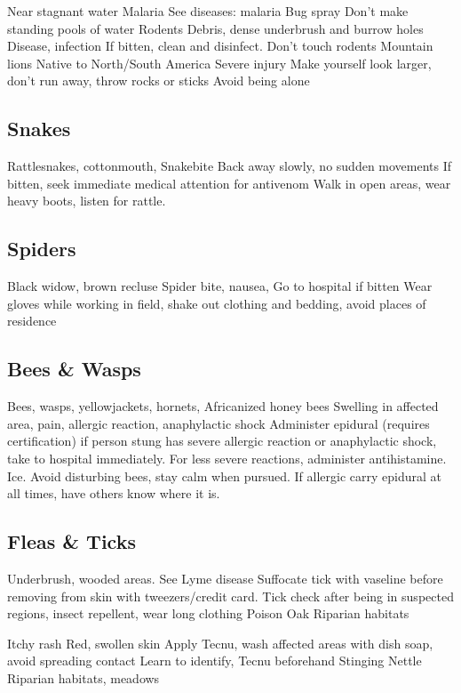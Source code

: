 \documentclass[12pt]{../SOP3_beta}
\begin{document}
Near stagnant water
Malaria
See diseases: malaria
Bug spray
Don’t make standing pools of water
Rodents
Debris, dense underbrush and burrow holes
Disease, infection
If bitten, clean and disinfect.
Don’t touch rodents
Mountain lions
Native to North/South America
Severe injury
Make yourself look larger, don’t run away, throw rocks or sticks
Avoid being alone 


\subsection{Snakes}

Rattlesnakes, cottonmouth, 
Snakebite
Back away slowly, no sudden movements
If bitten, seek immediate medical attention for antivenom
Walk in open areas, wear heavy boots, listen for rattle.

\subsection{Spiders}

Black widow, brown recluse
Spider bite, nausea, 
Go to hospital if bitten
Wear gloves while working in field, shake out clothing and bedding, avoid places of residence

\subsection{Bees \& Wasps}

Bees, wasps, yellowjackets, hornets, Africanized honey bees
Swelling in affected area, pain, allergic reaction, anaphylactic shock
Administer epidural (requires certification) if person stung has severe allergic reaction or anaphylactic shock, take to hospital immediately. For less severe reactions, administer antihistamine. Ice.
Avoid disturbing bees, stay calm when pursued. If allergic carry epidural at all times, have others know where it is.

\subsection{Fleas \& Ticks}

Underbrush, wooded areas.
See Lyme disease
Suffocate tick with vaseline before removing from skin with tweezers/credit card.
Tick check after being in suspected regions, insect repellent, wear long clothing
Poison Oak
Riparian habitats

Itchy rash
Red, swollen skin
Apply Tecnu, wash affected areas with dish soap, avoid spreading contact
Learn to identify, Tecnu beforehand
Stinging Nettle
Riparian habitats, meadows
\end{document}
